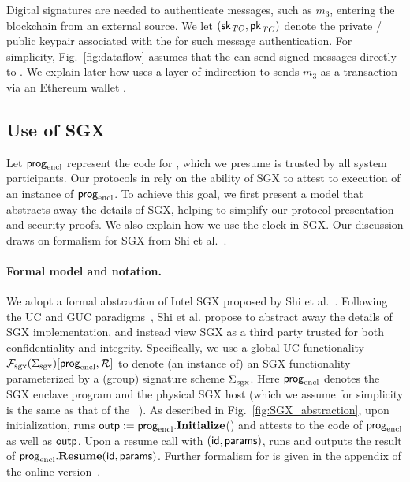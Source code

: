 Digital signatures are needed to authenticate messages, such as $m_3$, entering the blockchain from an external source. We let $({\sf sk}_{\it TC}, {\sf pk}_{\it TC})$ denote the private / public keypair associated with the \encname for such message authentication.
For simplicity, Fig.~\ref{fig:dataflow} assumes that the \encname can send signed messages directly to \tcont.
We explain later how \tc uses a layer of indirection to sends $m_3$ as a transaction via an Ethereum wallet \tcadd.

\vfill\eject
\subsection{Use of SGX}
\label{sec:useofsgx}

Let ${\sf prog}_{\textrm{encl}}$ represent the code for \encname, which we presume is trusted by all system participants.
Our protocols in \tc rely on the ability of SGX to attest to execution of an instance of ${\sf prog}_{\textrm{encl}}$.
To achieve this goal, we first present a model that abstracts away the details of SGX, helping to simplify our protocol presentation and security proofs.
We also explain how we use the clock in SGX.
Our discussion draws on formalism for SGX from Shi et al.~\cite{sgxsok}.


\paragraph{\bf Formal model and notation.} 
We adopt a formal abstraction
of Intel SGX proposed by Shi et al.~\cite{sgxsok}. %
Following the UC and GUC paradigms~\cite{uc,guc,juc}, Shi et al.
propose to 
abstract away the details of SGX implementation,
and instead view SGX
as a third party trusted
for both confidentiality and integrity.
Specifically, we use a global UC  
functionality $\mathcal{F}_{\textrm{sgx}}({\Sigma_{\textrm{sgx}}})[{\sf prog}_{\textrm{encl}}, \mathcal{R}]$
to denote (an instance of) an SGX functionality parameterized
by a (group) signature scheme ${\Sigma_{\textrm{sgx}}}$.
Here ${\sf prog}_{\textrm{encl}}$ denotes the SGX enclave program and \relay the physical
SGX host (which we assume for simplicity is the same as that of the \tc\ \medname).
As described in Fig.~\ref{fig:SGX_abstraction}, upon initialization, \fsgx runs ${\sf outp} := {\sf prog}_{\textrm{encl}}.{\bf Initialize}$()
and attests to the code of ${\sf prog}_{\textrm{encl}}$ as well as ${\sf outp}$.
Upon a resume call with ${(\sf id, params)}$, \fsgx runs and outputs the result of
${\sf prog}_{\textrm{encl}}.{\bf Resume}({\sf id, params})$.
Further formalism for \fsgx is given in the appendix of the 
online version~\cite{cryptoeprint:2016:168}.

